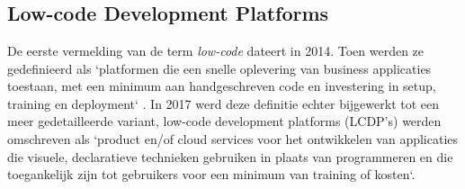 \chapter{}%
\label{ch:stand-van-zaken}





\section{Low-code Development Platforms}



De eerste vermelding van de term \textit{low-code} dateert in 2014. Toen werden ze gedefinieerd als `platformen die een snelle oplevering van business applicaties toestaan, met een minimum aan handgeschreven code en investering in setup, training en deployment` \autocite{Ruscio2022}. In 2017 werd deze definitie echter bijgewerkt tot een meer gedetailleerde variant, low-code development platforms (LCDP's) werden omschreven als `product en/of cloud services voor het ontwikkelen van applicaties die visuele, declaratieve technieken gebruiken in plaats van programmeren en die toegankelijk zijn tot gebruikers voor een minimum van training of kosten`. \\

